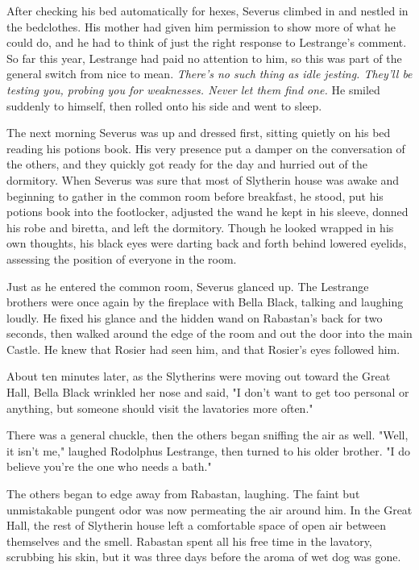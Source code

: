 \documentclass[a4paper,11pt]{article}
\begin{document}
After checking his bed automatically for hexes, Severus climbed in and nestled in the bedclothes. His mother had given him permission to show more of what he could do, and he had to think of just the right response to Lestrange's comment. So far this year, Lestrange had paid no attention to him, so this was part of the general switch from nice to mean. \emph{There's no such thing as idle jesting. They'll be testing you, probing you for weaknesses. Never let them find one.} He smiled suddenly to himself, then rolled onto his side and went to sleep.

The next morning Severus was up and dressed first, sitting quietly on his bed reading his potions book. His very presence put a damper on the conversation of the others, and they quickly got ready for the day and hurried out of the dormitory. When Severus was sure that most of Slytherin house was awake and beginning to gather in the common room before breakfast, he stood, put his potions book into the footlocker, adjusted the wand he kept in his sleeve, donned his robe and biretta, and left the dormitory. Though he looked wrapped in his own thoughts, his black eyes were darting back and forth behind lowered eyelids, assessing the position of everyone in the room.

Just as he entered the common room, Severus glanced up. The Lestrange brothers were once again by the fireplace with Bella Black, talking and laughing loudly. He fixed his glance and the hidden wand on Rabastan's back for two seconds, then walked around the edge of the room and out the door into the main Castle. He knew that Rosier had seen him, and that Rosier's eyes followed him.

About ten minutes later, as the Slytherins were moving out toward the Great Hall, Bella Black wrinkled her nose and said, "I don't want to get too personal or anything, but someone should visit the lavatories more often."

There was a general chuckle, then the others began sniffing the air as well. "Well, it isn't me," laughed Rodolphus Lestrange, then turned to his older brother. "I do believe you're the one who needs a bath."

The others began to edge away from Rabastan, laughing. The faint but unmistakable pungent odor was now permeating the air around him. In the Great Hall, the rest of Slytherin house left a comfortable space of open air between themselves and the smell. Rabastan spent all his free time in the lavatory, scrubbing his skin, but it was three days before the aroma of wet dog was gone.
\end{document}
